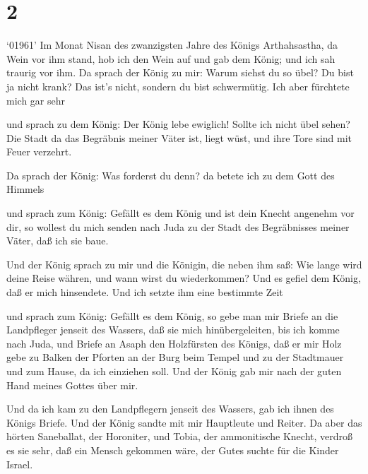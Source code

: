 \hypertarget{section-1}{%
\section{2}\label{section-1}}

 `01961' Im Monat Nisan des zwanzigsten Jahre des Königs
Arthahsastha, da Wein vor ihm stand, hob ich den Wein auf und gab dem
König; und ich sah traurig vor ihm.  Da sprach der König zu
mir: Warum siehst du so übel? Du bist ja nicht krank? Das ist's nicht,
sondern du bist schwermütig. Ich aber fürchtete mich gar sehr

 und sprach zu dem König: Der König lebe ewiglich! Sollte
ich nicht übel sehen? Die Stadt da das Begräbnis meiner Väter ist, liegt
wüst, und ihre Tore sind mit Feuer verzehrt.

 Da sprach der König: Was forderst du denn? da betete ich zu
dem Gott des Himmels

 und sprach zum König: Gefällt es dem König und ist dein
Knecht angenehm vor dir, so wollest du mich senden nach Juda zu der
Stadt des Begräbnisses meiner Väter, daß ich sie baue.

 Und der König sprach zu mir und die Königin, die neben ihm
saß: Wie lange wird deine Reise währen, und wann wirst du wiederkommen?
Und es gefiel dem König, daß er mich hinsendete. Und ich setzte ihm eine
bestimmte Zeit

 und sprach zum König: Gefällt es dem König, so gebe man mir
Briefe an die Landpfleger jenseit des Wassers, daß sie mich
hinübergeleiten, bis ich komme nach Juda,  und Briefe an
Asaph den Holzfürsten des Königs, daß er mir Holz gebe zu Balken der
Pforten an der Burg beim Tempel und zu der Stadtmauer und zum Hause, da
ich einziehen soll. Und der König gab mir nach der guten Hand meines
Gottes über mir.

 Und da ich kam zu den Landpflegern jenseit des Wassers, gab
ich ihnen des Königs Briefe. Und der König sandte mit mir Hauptleute und
Reiter.  Da aber das hörten Saneballat, der Horoniter, und
Tobia, der ammonitische Knecht, verdroß es sie sehr, daß ein Mensch
gekommen wäre, der Gutes suchte für die Kinder Israel.

